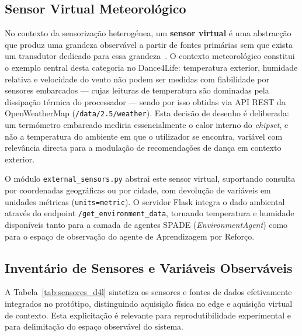 \documentclass[runningheads]{llncs}
\begin{document}
\subsection{Sensor Virtual Meteorológico}
No contexto da sensorização heterogénea, um \textbf{sensor virtual} é uma abstracção que produz uma grandeza observável a partir de fontes primárias sem que exista um transdutor dedicado para essa grandeza~\cite{bouchabou2021}. O contexto meteorológico constitui o exemplo central desta categoria no Dance4Life: temperatura exterior, humidade relativa e velocidade do vento não podem ser medidas com fiabilidade por sensores embarcados --- cujas leituras de temperatura são dominadas pela dissipação térmica do processador --- sendo por isso obtidas via API REST da OpenWeatherMap (\texttt{/data/2.5/weather}). Esta decisão de desenho é deliberada: um termómetro embarcado mediria essencialmente o calor interno do \textit{chipset}, e não a temperatura do ambiente em que o utilizador se encontra, variável com relevância directa para a modulação de recomendações de dança em contexto exterior.

O módulo \texttt{external\_sensors.py} abstrai este sensor virtual, suportando consulta por coordenadas geográficas ou por cidade, com devolução de variáveis em unidades métricas (\texttt{units=metric}). O servidor Flask integra o dado ambiental através do endpoint \texttt{/get\_environment\_data}, tornando temperatura e humidade disponíveis tanto para a camada de agentes SPADE (\textit{EnvironmentAgent}) como para o espaço de observação do agente de Aprendizagem por Reforço.

\subsection{Inventário de Sensores e Variáveis Observáveis}
A Tabela~\ref{tab:sensores_d4l} sintetiza os sensores e fontes de dados efetivamente integrados no protótipo, distinguindo aquisição física no edge e aquisição virtual de contexto. Esta explicitação é relevante para reprodutibilidade experimental e para delimitação do espaço observável do sistema.
\end{document}
